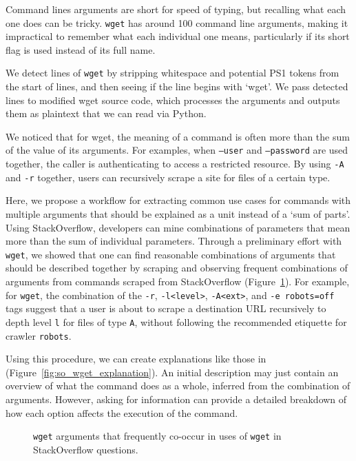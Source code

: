 Command lines arguments are short for speed of typing, but recalling what each one does can be tricky.
\texttt{wget} has around 100 command line arguments, making it impractical to remember what each individual one means, particularly if its short flag is used instead of its full name.

We detect lines of \texttt{wget} by stripping whitespace and potential PS1  tokens from the start of lines, and then seeing if the line begins with `wget'.
We pass detected lines to modified wget source code, which processes the arguments and outputs them as plaintext that we can read via Python.

We noticed that for wget, the meaning of a command is often more than the sum of the value of its arguments.
For examples, when \texttt{--user} and \texttt{--password} are used together, the caller is authenticating to access a restricted resource.
By using \texttt{-A} and \texttt{-r} together, users can recursively scrape a site for files of a certain type.

Here, we propose a workflow for extracting common use cases for commands with multiple arguments that should be explained as a unit instead of a `sum of parts'.
Using StackOverflow, developers can mine combinations of parameters that mean more than the sum of individual parameters.
Through a preliminary effort with \texttt{wget}, we showed that one can find reasonable combinations of arguments that should be described together by scraping and observing frequent combinations of arguments from commands scraped from StackOverflow  (Figure~\ref{fig:wget_arguments}).
For example, for \texttt{wget}, the combination of the \texttt{-r}, \texttt{-l<level>}, \texttt{-A<ext>}, and \texttt{-e robots=off} tags suggest that a user is about to scrape a destination URL recursively to depth level \texttt{l} for files of type \texttt{A}, without following the recommended etiquette for crawler \texttt{robots}.

Using this procedure, we can create explanations like those in (Figure~\ref{fig:so_wget_explanation}). 
An initial description may just contain an overview of what the command does as a whole, inferred from the combination of arguments.
However, asking for information can provide a detailed breakdown of how each option affects the execution of the command.

\begin{figure}
\caption{\texttt{wget} arguments that frequently co-occur in uses of \texttt{wget} in StackOverflow questions. }
\label{fig:wget_arguments}
\end{figure}
